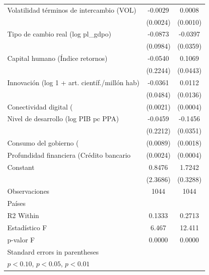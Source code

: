 \begin{table}[htbp]
\begin{tabular}{l*{2}{c}}
\addlinespace
Volatilidad términos de intercambio (VOL)&     -0.0029         &      0.0008         \\
                    &    (0.0024)         &    (0.0010)         \\
\addlinespace
Tipo de cambio real (log pl\_gdpo)&     -0.0873         &     -0.0397         \\
                    &    (0.0984)         &    (0.0359)         \\
\addlinespace
Capital humano (Índice retornos)&     -0.0540         &      0.1069\sym{**} \\
                    &    (0.2244)         &    (0.0443)         \\
\addlinespace
Innovación (log 1 + art. científ./millón hab)&     -0.0361         &      0.0112         \\
                    &    (0.0484)         &    (0.0136)         \\
\addlinespace
Conectividad digital (%
                    &    (0.0021)         &    (0.0004)         \\
\addlinespace
Nivel de desarrollo (log PIB pc PPA)&     -0.0459         &     -0.1456\sym{***}\\
                    &    (0.2212)         &    (0.0351)         \\
\addlinespace
Consumo del gobierno (%
                    &    (0.0089)         &    (0.0018)         \\
\addlinespace
Profundidad financiera (Crédito bancario %
                    &    (0.0024)         &    (0.0004)         \\
\addlinespace
Constant            &      0.8476         &      1.7242\sym{***}\\
                    &    (2.3686)         &    (0.3288)         \\
\midrule
Observaciones       &        1044         &        1044         \\
Países              &                     &                     \\
R2 Within           &      0.1333         &      0.2713         \\
Estadístico F       &       6.467         &      12.411         \\
p-valor F           &      0.0000         &      0.0000         \\
\bottomrule
\multicolumn{3}{l}{\footnotesize Standard errors in parentheses}\\
\multicolumn{3}{l}{\footnotesize \sym{*} \(p<0.10\), \sym{**} \(p<0.05\), \sym{***} \(p<0.01\)}\\
\end{tabular}
\end{table}
